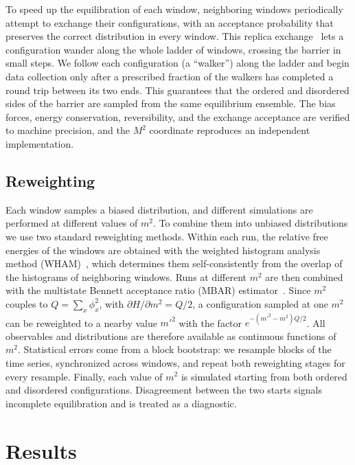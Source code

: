 \documentclass[aps,prd,twocolumn,superscriptaddress,nofootinbib,10pt]{revtex4-2}
\begin{document}
To speed up the equilibration of each window, neighboring windows
periodically attempt to exchange their configurations, with an acceptance
probability that preserves the correct distribution in every window.  This
replica exchange~\cite{Swendsen1986,Hukushima1996,Sugita2000} lets a
configuration wander along the whole ladder of windows, crossing the barrier
in small steps.  We follow each configuration (a ``walker'') along the
ladder and begin data collection only after a prescribed fraction of the
walkers has completed a round trip between its two ends.  This guarantees
that the ordered and disordered sides of the barrier are sampled from the
same equilibrium ensemble.  The bias forces, energy conservation,
reversibility, and the exchange acceptance are verified to machine precision,
and the $M^2$ coordinate reproduces an independent implementation.

\subsection{Reweighting}

Each window samples a biased distribution, and different simulations are
performed at different values of $m^2$.  To combine them into unbiased
distributions we use two standard reweighting methods.  Within each run, the
relative free energies of the windows are obtained with the weighted
histogram analysis method (WHAM)~\cite{Kumar1992}, which determines them
self-consistently from the overlap of the histograms of neighboring windows.
Runs at different $m^2$ are then combined with the multistate Bennett
acceptance ratio (MBAR) estimator~\cite{Shirts2008,Ferrenberg1989}.  Since
$m^2$ couples to $Q=\sum_x\phi_x^2$, with $\partial H/\partial m^2=Q/2$, a
configuration sampled at one $m^2$ can be reweighted to a nearby value
$m'^2$ with the factor $e^{-(m'^2-m^2)Q/2}$.  All observables and
distributions are therefore available as continuous functions of $m^2$.
Statistical errors come from a block bootstrap: we resample blocks of the
time series, synchronized across windows, and repeat both reweighting stages
for every resample.  Finally, each value of $m^2$ is simulated starting from
both ordered and disordered configurations.  Disagreement between the two
starts signals incomplete equilibration and is treated as a diagnostic.

\section{Results}
\label{sec:results}
\end{document}
